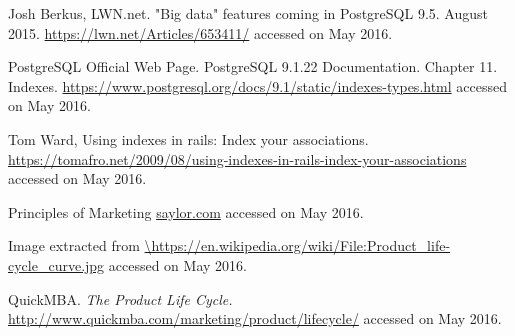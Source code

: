 \begin{thebibliography}{99999}
 Josh Berkus, LWN.net. "Big data" features coming in PostgreSQL 9.5. August 2015. \url{https://lwn.net/Articles/653411/} accessed on May 2016. 

 PostgreSQL Official Web Page. PostgreSQL 9.1.22 Documentation. Chapter 11. Indexes. \url{https://www.postgresql.org/docs/9.1/static/indexes-types.html} accessed on May 2016.

 Tom Ward, Using indexes in rails: Index your associations. \url{https://tomafro.net/2009/08/using-indexes-in-rails-index-your-associations} accessed on May 2016.

 Principles of Marketing \url{saylor.com} accessed on May 2016.

 Image extracted from  \url{\https://en.wikipedia.org/wiki/File:Product_life-cycle_curve.jpg} accessed on May 2016.

 QuickMBA. \textit{The Product Life Cycle.} \url{http://www.quickmba.com/marketing/product/lifecycle/} accessed on May 2016.

\end{thebibliography}
